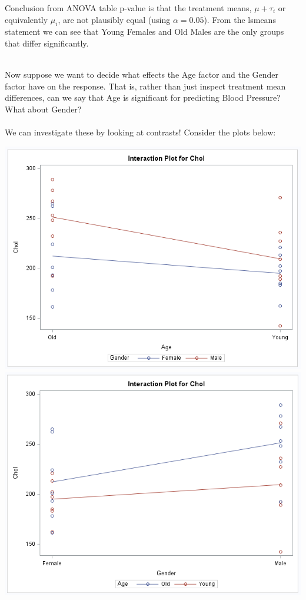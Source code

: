 Conclusion from ANOVA table p-value is that the treatment means, $\mu+\tau_i$ or equivalently $\mu_i$, are not plausibly equal (using $\alpha=0.05$).  From the lsmeans statement we can see that Young Females and Old Males are the only groups that differ significantly.\\~\\

\newpage

Now suppose we want to decide what effects the Age factor and the Gender factor have on the response.  That is, rather than just inspect treatment mean differences, can we say that Age is significant for predicting Blood Pressure? What about Gender? \\~\\

We can investigate these by looking at contrasts!  Consider the plots below:
\begin{center}
\includegraphics[scale=0.5]{CholIntPlot1}\includegraphics[scale=0.5]{CholIntPlot2}
\end{center}


